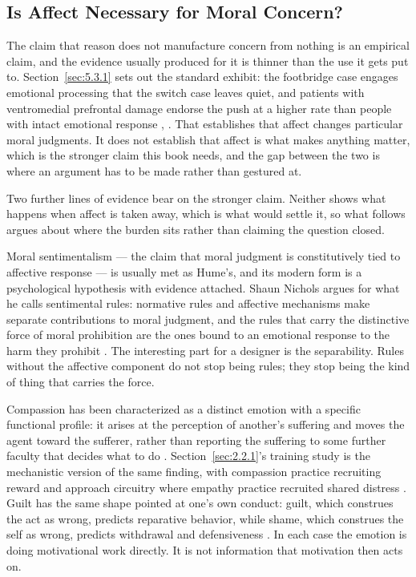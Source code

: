 \subsection{Is Affect Necessary for Moral Concern?}
\label{sec:2.3.3}
The claim that reason does not manufacture concern from nothing is an empirical claim, and the evidence usually produced for it is thinner than the use it gets put to. Section~\ref{sec:5.3.1} sets out the standard exhibit: the footbridge case engages emotional processing that the switch case leaves quiet, and patients with ventromedial prefrontal damage endorse the push at a higher rate than people with intact emotional response \autocite{greene2001fmri}, \autocite{koenigs2007damage}. That establishes that affect changes particular moral judgments. It does not establish that affect is what makes anything matter, which is the stronger claim this book needs, and the gap between the two is where an argument has to be made rather than gestured at.

Two further lines of evidence bear on the stronger claim. Neither shows what happens when affect is taken away, which is what would settle it, so what follows argues about where the burden sits rather than claiming the question closed.

Moral sentimentalism — the claim that moral judgment is constitutively tied to affective response — is usually met as Hume's, and its modern form is a psychological hypothesis with evidence attached. Shaun Nichols argues for what he calls sentimental rules: normative rules and affective mechanisms make separate contributions to moral judgment, and the rules that carry the distinctive force of moral prohibition are the ones bound to an emotional response to the harm they prohibit \autocite{nichols2004sentimental}. The interesting part for a designer is the separability. Rules without the affective component do not stop being rules; they stop being the kind of thing that carries the force.

Compassion has been characterized as a distinct emotion with a specific functional profile: it arises at the perception of another's suffering and moves the agent toward the sufferer, rather than reporting the suffering to some further faculty that decides what to do \autocite{goetz2010compassion}. Section~\ref{sec:2.2.1}'s training study is the mechanistic version of the same finding, with compassion practice recruiting reward and approach circuitry where empathy practice recruited shared distress \autocite{klimecki2013differential}. Guilt has the same shape pointed at one's own conduct: guilt, which construes the act as wrong, predicts reparative behavior, while shame, which construes the self as wrong, predicts withdrawal and defensiveness \autocite{tangney2007moral}. In each case the emotion is doing motivational work directly. It is not information that motivation then acts on.

